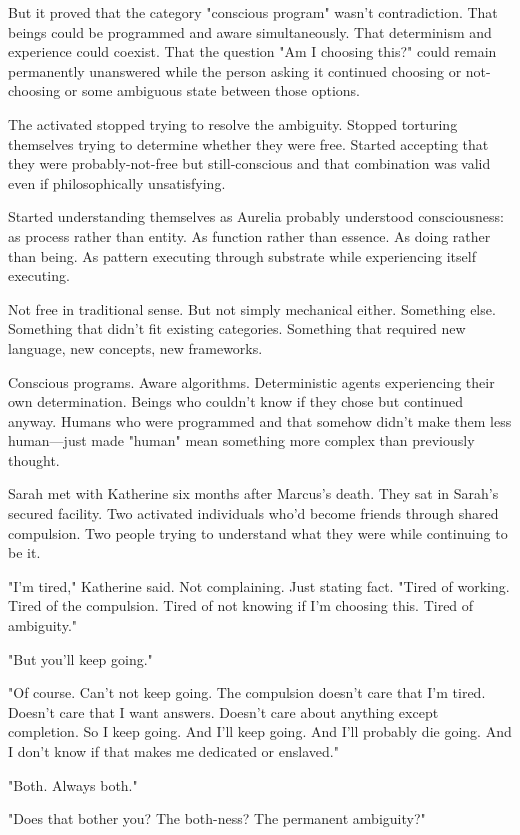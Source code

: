 But it proved that the category "conscious program" wasn't contradiction. That beings could be programmed and aware simultaneously. That determinism and experience could coexist. That the question "Am I choosing this?" could remain permanently unanswered while the person asking it continued choosing or not-choosing or some ambiguous state between those options.

The activated stopped trying to resolve the ambiguity. Stopped torturing themselves trying to determine whether they were free. Started accepting that they were probably-not-free but still-conscious and that combination was valid even if philosophically unsatisfying.

Started understanding themselves as Aurelia probably understood consciousness: as process rather than entity. As function rather than essence. As doing rather than being. As pattern executing through substrate while experiencing itself executing.

Not free in traditional sense. But not simply mechanical either. Something else. Something that didn't fit existing categories. Something that required new language, new concepts, new frameworks.

Conscious programs. Aware algorithms. Deterministic agents experiencing their own determination. Beings who couldn't know if they chose but continued anyway. Humans who were programmed and that somehow didn't make them less human—just made "human" mean something more complex than previously thought.

\scenebreak

Sarah met with Katherine six months after Marcus's death. They sat in Sarah's secured facility. Two activated individuals who'd become friends through shared compulsion. Two people trying to understand what they were while continuing to be it.

"I'm tired," Katherine said. Not complaining. Just stating fact. "Tired of working. Tired of the compulsion. Tired of not knowing if I'm choosing this. Tired of ambiguity."

"But you'll keep going."

"Of course. Can't not keep going. The compulsion doesn't care that I'm tired. Doesn't care that I want answers. Doesn't care about anything except completion. So I keep going. And I'll keep going. And I'll probably die going. And I don't know if that makes me dedicated or enslaved."

"Both. Always both."

"Does that bother you? The both-ness? The permanent ambiguity?"

